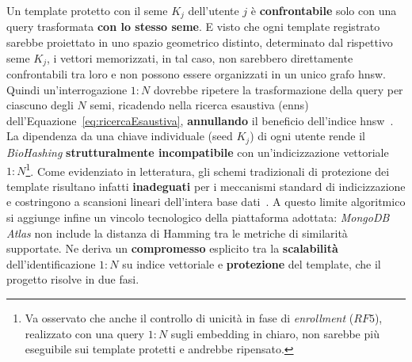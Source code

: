 Un template protetto con il seme $K_j$ dell'utente $j$ è \textbf{confrontabile} solo con una query trasformata \textbf{con lo stesso seme}. 
E visto che ogni template registrato sarebbe proiettato in uno spazio geometrico distinto, determinato dal rispettivo seme $K_j$, i vettori memorizzati, in tal caso, non sarebbero direttamente confrontabili tra loro e non possono essere organizzati in un unico grafo \gls{hnsw}. 
Quindi un'interrogazione $1:N$ dovrebbe ripetere la trasformazione della query per ciascuno degli $N$ semi, ricadendo nella ricerca esaustiva (\gls{enns}) dell'Equazione~\eqref{eq:ricercaEsaustiva}, \textbf{annullando} il beneficio dell'indice \gls{hnsw}~\cite{osorio-roigPrivacypreservingMultibiometricIndexing2023, MongoDBVectorSearch}.
La dipendenza da una chiave individuale (seed $K_j$) di ogni utente rende il \textit{BioHashing} \textbf{strutturalmente incompatibile} con un'indicizzazione vettoriale $1:N$\footnote{Va osservato che anche il controllo di unicità in fase di \textit{enrollment} ($RF5$), realizzato con una query $1:N$ sugli embedding in chiaro, non sarebbe più eseguibile sui template protetti e andrebbe ripensato.}.
Come evidenziato in letteratura, gli schemi tradizionali di protezione dei template risultano infatti \textbf{inadeguati} per i meccanismi standard di indicizzazione e costringono a scansioni lineari dell'intera base dati~\cite{osorio-roigPrivacypreservingMultibiometricIndexing2023}. 
A questo limite algoritmico si aggiunge infine un vincolo tecnologico della piattaforma adottata: \textit{MongoDB Atlas} non include la distanza di Hamming tra le metriche di similarità supportate.
Ne deriva un \textbf{compromesso} esplicito tra la \textbf{scalabilità} dell'identificazione $1:N$ su indice vettoriale e \textbf{protezione} del template, che il progetto risolve in due fasi. 
